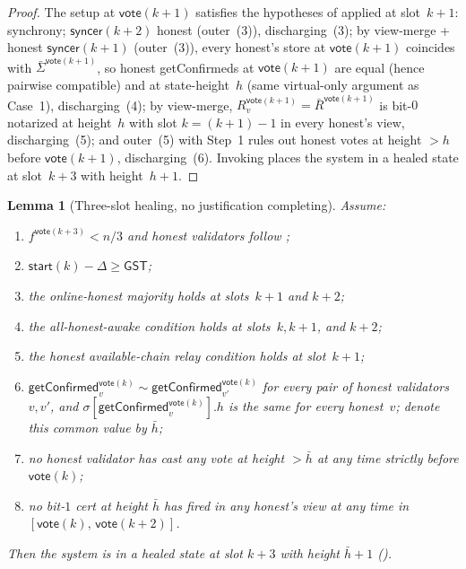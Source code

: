 \ifx\litemode\undefined\documentclass{article}\fi
\newcommand{\syncer}{\mathsf{syncer}}
\newcommand{\start}{\mathsf{start}}
\newcommand{\vote}{\mathsf{vote}}
\newcommand{\comm}[1]{\bar{#1}}
\newcommand{\getConfirmed}{\textsf{getConfirmed}\xspace}
\theoremstyle{plain}
\newtheorem{lemma}{Lemma}
\theoremstyle{definition}
\theoremstyle{remark}
\newcommand{\GST}{\ensuremath{\mathsf{GST}}}
\newcommand{\OHM}{online-honest majority\xspace}
\newcommand{\HAR}{honest available-chain relay\xspace}
\newcommand{\AHA}{all-honest-awake\xspace}
\begin{document}
\begin{proof}
The setup at $\vote(k+1)$ satisfies the hypotheses of  applied at slot~$k+1$: synchrony; $\syncer(k+2)$ honest (outer~(3)), discharging~(3); by view-merge + honest $\syncer(k+1)$ (outer~(3)), every honest's store at $\vote(k+1)$ coincides with $\comm{\Sigma}^{\vote(k+1)}$, so honest \getConfirmed{}s at $\vote(k+1)$ are equal (hence pairwise compatible) and at state-height~$h$ (same virtual-only argument as Case~1), discharging~(4); by view-merge, $R_v^{\vote(k+1)} = \comm{R}^{\vote(k+1)}$ is bit-$0$ notarized at height~$h$ with slot $k = (k+1)-1$ in every honest's view, discharging~(5); and outer~(5) with Step~1 rules out honest votes at height $>h$ before $\vote(k+1)$, discharging~(6). Invoking  places the system in a healed state at slot~$k+3$ with height~$h+1$.
\end{proof}

\begin{lemma}[Three-slot healing, no justification completing]\label{rev:lem:healing-three-slot-no-just}
Assume:
\begin{enumerate}
  \item $f^{\vote(k+3)} < n/3$ and honest validators follow ;
  \item $\start(k) - \Delta \geq \GST$;
  \item the \OHM holds at slots~$k+1$ and $k+2$;
  \item the \AHA condition holds at slots~$k, k+1$, and $k+2$;
  \item the \HAR condition holds at slot~$k+1$;
  \item $\getConfirmed_v^{\vote(k)} \sim \getConfirmed_{v'}^{\vote(k)}$ for every pair of honest validators~$v, v'$, and $\sigma[\getConfirmed_v^{\vote(k)}].h$ is the same for every honest~$v$; denote this common value by $\comm{h}$;
  \item no honest validator has cast any vote at height $> \comm{h}$ at any time strictly before $\vote(k)$;
  \item no bit-$1$ cert at height $\comm{h}$ has fired in any honest's view at any time in $[\vote(k),\, \vote(k+2)]$.
\end{enumerate}
Then the system is in a healed state at slot $k+3$ with height $\comm{h}+1$ ().
\end{lemma}
\end{document}

